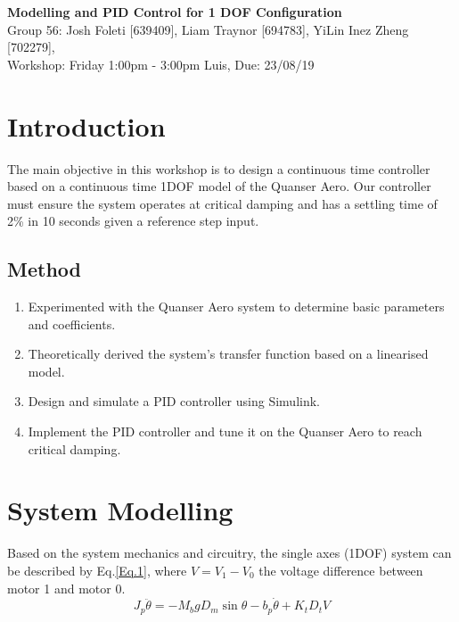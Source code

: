 \documentclass[11pt]{article}
\begin{document}

\clearpage
\setcounter{page}{1}

\begin{center}
\textbf{\Large{Modelling and PID Control for 1 DOF Configuration}}\\
Group 56: Josh Foleti [639409], Liam Traynor [694783], YiLin Inez Zheng [702279], \\
Workshop: Friday 1:00pm - 3:00pm Luis, Due: 23/08/19  
\end{center}

\section{Introduction}
The main objective in this workshop is to design a continuous time controller based on a continuous time 1DOF model of the Quanser Aero. Our controller must ensure the system operates at critical damping and has a settling time of 2\% in 10 seconds given a reference step input. 

\subsection{Method}
\begin{enumerate}
    \item %
    Experimented with the Quanser Aero system to determine basic parameters and coefficients. 
    \item %
    Theoretically derived the system's transfer function based on a linearised model. 
    \item %
    Design and simulate a PID controller using Simulink.
    \item %
    Implement the PID controller and tune it on the Quanser Aero to reach critical damping.
\end{enumerate}

\section{System Modelling}
Based on the system mechanics and circuitry, the single axes (1DOF) system can be described by Eq.\ref{Eq.1}, where $V = V_1 - V_0$ the voltage difference between motor 1 and motor 0. 
\begin{equation}\label{Eq.1}
    J_p \ddot{\theta} = -M_b g D_m \sin \theta - b_p \dot{\theta} + K_t D_t V
\end{equation}
\end{document}
